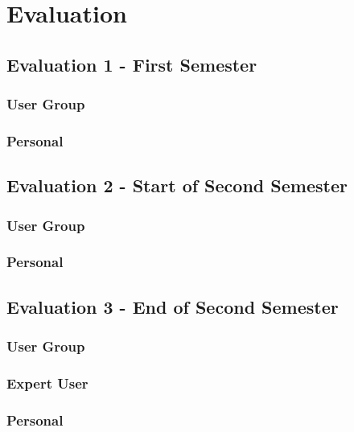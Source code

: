 \section{Evaluation}

\subsection{Evaluation 1 - First Semester}

\subsubsection{User Group}
\subsubsection{Personal}

\subsection{Evaluation 2 - Start of Second Semester}
\subsubsection{User Group}
\subsubsection{Personal}

\subsection{Evaluation 3 - End of Second Semester}
\subsubsection{User Group}
\subsubsection{Expert User}
\subsubsection{Personal}
